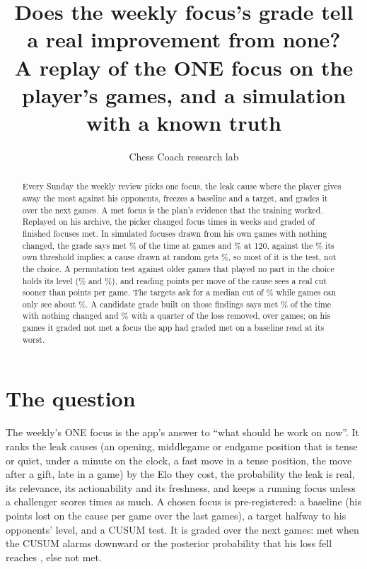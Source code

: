 \documentclass[11pt]{article}
\title{Does the weekly focus's grade tell a real improvement from none?\\[0.3em]
\large A replay of the ONE focus on the player's games, and a simulation with a known truth}
\author{Chess Coach research lab}
\date{}
\begin{document}
\maketitle

\begin{abstract}
Every Sunday the weekly review picks one focus, the leak cause where the player gives away the
most against his opponents, freezes a baseline and a target, and grades it over the next \Window{}
games. A met focus is the plan's evidence that the training worked. Replayed on his archive, the
picker changed focus \Switches{} times in \Weeks{} weeks and graded \Met{} of \Finished{} finished
focuses met. In \Runs{} simulated focuses drawn from his own games with nothing changed, the grade
says met \NullApp\% of the time at \Window{} games and \NullAppLong\% at 120, against the \Level\% its
own \SuccessP{} threshold implies; a cause drawn at random gets \NullControl\%, so most of it is the test, not the choice. A
permutation test against older games that played no part in the choice holds its level
(\NullFresh\% and \NullPerMove\%), and reading points per move of the cause sees a real cut
sooner than points per game. The targets ask for a median cut of \TargetCut\% while \Window{}
games can only see about \NeededCut\%. A candidate grade built on those findings says met
\CandNullLong\% of the time with nothing changed and \CandQuarterLong\% with a quarter of the loss
removed, over \CandWindow{} games; on his games it graded not met a focus the app had graded met
on a baseline read at its worst.
\end{abstract}

\section{The question}

The weekly's ONE focus is the app's answer to ``what should he work on now''. It ranks the leak
causes (an opening, middlegame or endgame position that is tense or quiet, under a minute on the
clock, a fast move in a tense position, the move after a gift, late in a game) by the Elo they
cost, the probability the leak is real, its relevance, its actionability and its freshness, and
keeps a running focus unless a challenger scores \SwitchRatio{} times as much. A chosen focus is
pre-registered: a baseline (his points lost on the cause per game over the last \Baseline{}
games), a target halfway to his opponents' level, and a CUSUM test. It is graded over the next
\Window{} games: met when the CUSUM alarms downward or the posterior probability that his loss
fell reaches \SuccessP, else not met.
\end{document}
